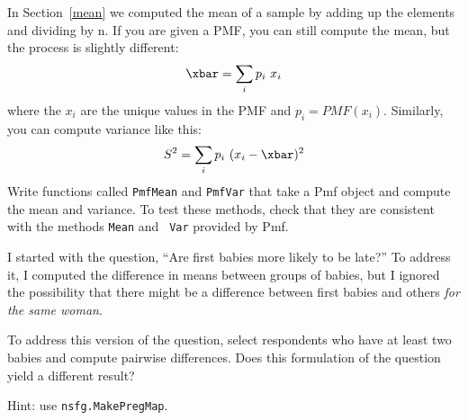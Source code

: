 \begin{exercise}

In Section~\ref{mean} we computed the mean of a sample by adding up
the elements and dividing by n.  If you are given a PMF, you can
still compute the mean, but the process is slightly different:
%
\[ \xbar = \sum_i p_i~x_i \]
%
where the $x_i$ are the unique values in the PMF and $p_i=PMF(x_i)$.
Similarly, you can compute variance like this:
%
\[ S^2 = \sum_i p_i~(x_i - \xbar)^2\]
% 
Write functions called {\tt PmfMean} and {\tt PmfVar} that take a
Pmf object and compute the mean and variance.  To test these methods,
check that they are consistent with the methods {\tt Mean} and {\tt
  Var} provided by Pmf.

\end{exercise}


\begin{exercise}
I started with the question, ``Are first babies more likely
to be late?''  To address it, I computed the difference in
means between groups of babies, but I ignored the possibility
that there might be a difference between first babies and
others {\em for the same woman}.

To address this version of the question, select respondents who
have at least two babies and compute pairwise differences.  Does
this formulation of the question yield a different result?

Hint: use {\tt nsfg.MakePregMap}.
\end{exercise}



